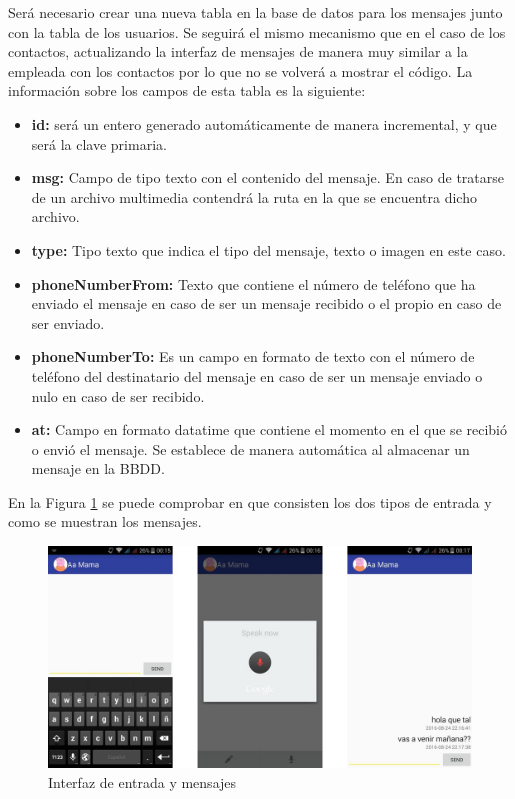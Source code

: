 Será necesario crear una nueva tabla en la base de datos para los mensajes junto con la tabla de los usuarios. Se seguirá el mismo mecanismo que en el caso de los contactos, actualizando la interfaz de mensajes de manera muy similar a la empleada con los contactos por lo que no se volverá a mostrar el código. La información sobre los campos de esta tabla es la siguiente:

\begin{itemize}
\item \textbf{\textunderscore id:} será un entero generado automáticamente de manera incremental, y que será la clave primaria.
\item \textbf{msg:} Campo de tipo texto con el contenido del mensaje. En caso de tratarse de un archivo multimedia contendrá la ruta en la que se encuentra dicho archivo.
\item \textbf{type:} Tipo texto que indica el tipo del mensaje, texto o imagen en este caso.
\item \textbf{phoneNumberFrom:} Texto que contiene el número de teléfono que ha enviado el mensaje en caso de ser un mensaje recibido o el propio en caso de ser enviado.
\item  \textbf{phoneNumberTo:} Es un campo en formato de texto con el número de teléfono del destinatario del mensaje en caso de ser un mensaje enviado o nulo en caso de ser recibido.
\item \textbf{at:} Campo en formato datatime que contiene el momento en el que se recibió o envió el mensaje. Se establece de manera automática al almacenar un mensaje en la \ac{BBDD}.
\end{itemize}

En la Figura \ref{fig:interfaz-conversacion} se puede comprobar en que consisten los dos tipos de entrada y como se muestran los mensajes.


\begin{figure}[!h]
\begin{center}
\includegraphics[width=1\textwidth]{./figures/interfaz-conversacion.jpg}
\caption{Interfaz de entrada y mensajes}
\label{fig:interfaz-conversacion}
\end{center}
\end{figure}


